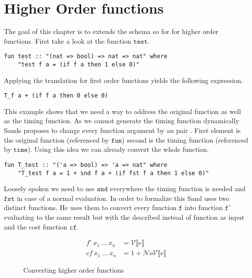 
\section{Higher Order functions} \label{chapter:higher_order}

The goal of this chapter is to extends the schema so for for higher order functions.
First take a look at the function $\texttt{test}$.
\begin{lstlisting}[language=isabelle,mathescape=true]
  fun test :: "(nat => bool) => nat => nat" where
    "test f a = (if f a then 1 else 0)"
\end{lstlisting}
Applying the translation for first order functions yields the following expression.
\begin{lstlisting}[language=isabelle,mathescape=true]
  T_f a + (if f a then 0 else 0)
\end{lstlisting}

This example shows that we need a way to address the original function as well as the timing function.
As we cannot generate the timing function dynamically Sands proposes to change every function argument by an pair \parencite{sands}.
First element is the original function (referenced by $\texttt{fun}$) second is the timing function (referenced by $\texttt{time}$).
Using this idea we can already convert the whole function.
\begin{lstlisting}[language=isabelle,mathescape=true]
  fun T_test :: "('a => bool) => 'a => nat" where
    "T_test f a = 1 + snd f a + (if fst f a then 1 else 0)"
\end{lstlisting}
Loosely spoken we need to use $\texttt{snd}$ everywhere the timing function is needed and $\texttt{fst}$ in case of a normal evaluation.
In order to formalize this Sand uses two distinct functions.
He uses them to convert every function $\texttt{f}$ into function $\texttt{f'}$ evaluating to the same result but with the described instead of function as input and the cost function $\texttt{cf}$.
\begin{figure}
  \begin{align*}
  f'\ x_{1}\ \dots\ x_{n} &= \mathcal{V}\llbracket e \rrbracket \\
  cf\ x_{1}\ \dots\ x_{n} &= 1 + \mathcal{N}o\mathcal{V}\llbracket e \rrbracket
  \end{align*}
  \caption{Converting higher order functions}
\end{figure}

